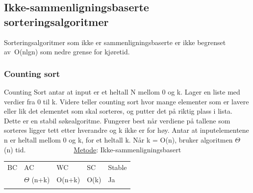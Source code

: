 \documentclass[12pt]{report}
\begin{document}

\setlength{\parskip}{6.0pt}

\vspace{\baselineskip}\subsection*{Ikke-sammenligningsbaserte sorteringsalgoritmer}
\setlength{\parskip}{0.0pt}
Sorteringsalgoritmer som ikke er sammenligningsbaserte er ikke begrenset av O(nlgn) som nedre grense for kjøretid. \par


\vspace{\baselineskip}
\setlength{\parskip}{6.0pt}
\subsubsection*{Counting sort}
\setlength{\parskip}{10.56pt}
Counting Sort antar at input er et heltall N mellom 0 og k. Lager en liste med verdier fra 0 til k. Videre teller counting sort hvor mange elementer som er lavere eller lik det elementet som skal sorteres, og putter det på riktig plass i lista. Dette er en stabil søkealgoritme. Fungerer best når verdiene på tallene som sorteres ligger tett etter hverandre og k ikke er for høy. Antar at inputelementene n er heltall mellom 0 og k, for et heltall k. Når k = O(n), bruker algoritmen $ \Theta $ (n) tid.\tab \tab \ \ \ \ \ \  \tab \tab \ \ \ \ \ \ \ \  \uline{Metode}: Ikke-sammenligningsbasert\par





\begin{table}[H]
 			\centering
\begin{tabular}{p{1.3in}p{1.29in}p{1.29in}p{0.82in}p{0.98in}}
\hline
\multicolumn{1}{p{1.3in}}{{\fontsize{13pt}{15.6pt}\selectfont BC}} & 
\multicolumn{1}{p{1.29in}}{{\fontsize{13pt}{15.6pt}\selectfont AC}} & 
\multicolumn{1}{p{1.29in}}{{\fontsize{13pt}{15.6pt}\selectfont WC}} & 
\multicolumn{1}{p{0.82in}}{{\fontsize{13pt}{15.6pt}\selectfont SC}} & 
\multicolumn{1}{p{0.98in}}{{\fontsize{13pt}{15.6pt}\selectfont Stable}} \\
\hhline{-----}
\multicolumn{1}{p{1.3in}}{{\fontsize{14pt}{16.8pt}\selectfont $ \Omega $ (n+k)}} & 
\multicolumn{1}{p{1.29in}}{{\fontsize{14pt}{16.8pt}\selectfont $ \Theta $ (n+k)}} & 
\multicolumn{1}{p{1.29in}}{{\fontsize{14pt}{16.8pt}\selectfont O(n+k)}} & 
\multicolumn{1}{p{0.82in}}{{\fontsize{14pt}{16.8pt}\selectfont O(k)}} & 
\multicolumn{1}{p{0.98in}}{{\fontsize{13pt}{15.6pt}\selectfont Ja}} \\
\hhline{-----}

\end{tabular}
 \end{table}
\end{document}
